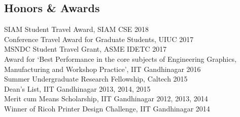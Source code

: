 \documentclass[margin]{res}
\begin{document}
\begin{resume}
%
%
		 
\section{\large Honors \& Awards}
SIAM Student Travel Award, SIAM CSE \hfill 2018\vspace{0.1cm}\\
Conference Travel Award for Graduate Students, UIUC \hfill 2017\vspace{0.1cm}\\
MSNDC Student Travel Grant, ASME IDETC \hfill 2017\vspace{0.1cm}\\
Award for `Best Performance in the core subjects of Engineering Graphics, Manufacturing and Workshop Practice', IIT Gandhinagar \hfill 2016\vspace{0.1cm}\\
Summer Undergraduate Research Fellowship, Caltech \hfill 2015\vspace{0.1cm}\\
Dean's List, IIT Gandhinagar \hfill 2013, 2014, 2015\vspace{0.1cm}\\
Merit cum Means Scholarship, IIT Gandhinagar \hfill 2012, 2013, 2014\vspace{0.1cm}\\
Winner of Ricoh Printer Design Challenge, IIT Gandhinagar \hfill 2014


\end{resume}
\end{document}
